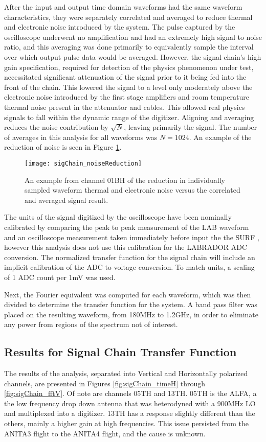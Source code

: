 		After the input and output time domain waveforms had the same waveform characteristics, they were separately correlated and averaged to reduce thermal and electronic noise introduced by the system.  The pulse captured by the oscilloscope underwent no amplification and had an extremely high signal to noise ratio, and this averaging was done primarily to equivalently sample the interval over which output pulse data would be averaged.  However, the signal chain's high gain specification, required for detection of the physics phenomenon under test, necessitated significant attenuation of the signal prior to it being fed into the front of the chain.  This lowered the signal to a level only moderately above the electronic noise introduced by the first stage amplifiers and room temperature thermal noise present in the attenuator and cables.  This allowed real physics signals to fall within the dynamic range of the digitizer.  Aligning and averaging reduces the noise contribution by $\sqrt{N}$, leaving primarily the signal.  The number of averages in this analysis for all waveforms was $N=1024$.  An example of the reduction of noise is seen in Figure \ref{fig:sigChain_noiseReduction}.
		
\begin{figure}
\centering
	\texttt{[image: sigChain\_noiseReduction]}
	\caption{An example from channel 01BH of the reduction in individually sampled waveform thermal and electronic noise versus the correlated and averaged signal result.}
\label{fig:sigChain_noiseReduction}
\end{figure}	
		
		The units of the signal digitized by the oscilloscope have been nominally calibrated by comparing the peak to peak measurement of the LAB waveform and an oscilloscope measurement taken immediately before input the the SURF , however this analysis does not use this calibration for the LABRADOR ADC conversion.  The normalized transfer function for the signal chain will include an implicit calibration of the ADC to voltage conversion.  To match units, a scaling of 1 ADC count per 1mV was used.
		
		Next, the Fourier equivalent was computed for each waveform, which was then divided to determine the transfer function for the system.  A band pass filter was placed on the resulting waveform, from 180MHz to 1.2GHz, in order to eliminate any power from regions of the spectrum not of interest.
		
		

	
	\subsection{Results for Signal Chain Transfer Function}
		The results of the analysis, separated into Vertical and Horizontally polarized channels, are presented in Figures \ref{fig:sigChain_timeH} through \ref{fig:sigChain_fftV}.  Of note are channels 05TH and 13TH.  05TH is the ALFA, a the low frequency drop down antenna that was heterodyned with a 900MHz LO and multiplexed into a digitizer.  13TH has a response slightly different than the others, mainly a higher gain at high frequencies.  This issue persisted from the ANITA3 flight to the ANITA4 flight, and the cause is unknown.
		
